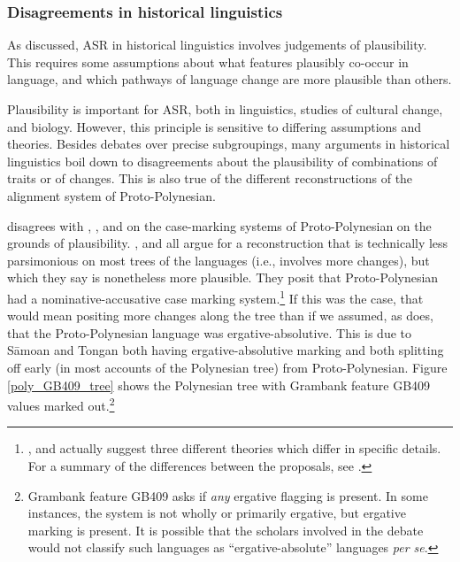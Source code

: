 \documentclass[12pt,letterpaper]{article}
\begin{document}

\FloatBarrier
\subsubsection{Disagreements in historical linguistics}
\label{sec:hl_disagreements}
As discussed, ASR in historical linguistics involves judgements of plausibility. This requires some assumptions about what features plausibly co-occur in language, and which pathways of language change are more plausible than others. 

Plausibility is important for ASR, both in linguistics, studies of cultural change, and biology. However, this principle is sensitive to differing assumptions and theories. Besides debates over precise subgroupings, many arguments in historical linguistics boil down to disagreements about the plausibility of combinations of traits or of changes. This is also true of the different reconstructions of the alignment system of Proto-Polynesian.

\citet{clark1973aspects} disagrees with \citet{hale_1968}, \citet{hohepa_1969}, and \citet{chung1978} on the case-marking systems of Proto-Polynesian on the grounds of plausibility. \citeauthor{chung1978}, \citeauthor{hale_1968} and \citeauthor{hohepa_1969} all argue for a reconstruction that is technically less parsimonious on most trees of the languages (i.e., involves more changes), but which they say is nonetheless more plausible. They posit that Proto-Polynesian had a nominative-accusative case marking system.\footnote{\citealt{hale_1968}, \citealt{hohepa_1969} and \citealt{chung1978} actually suggest three different theories which differ in specific details. For a summary of the differences between the proposals, see \citet[247--249]{chung1978}.} If this was the case, that would mean positing more changes along the tree than if we assumed, as \citet{clark1973aspects} does, that the Proto-Polynesian language was ergative-absolutive. This is due to S\={a}moan and Tongan both having ergative-absolutive marking and both splitting off early (in most accounts of the Polynesian tree) from Proto-Polynesian. Figure \ref{poly_GB409_tree} shows the Polynesian tree with Grambank feature GB409 values marked out.\footnote{Grambank feature GB409 asks if \textit{any} ergative flagging is present. In some instances, the system is not wholly or primarily ergative, but ergative marking is present. It is possible that the scholars involved in the debate would not classify such languages as ``ergative-absolute'' languages \textit{per se}.}
\end{document}
